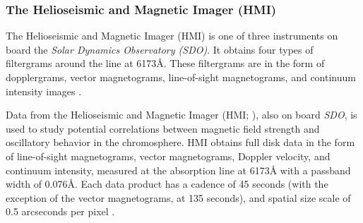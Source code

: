\subsubsection{The Helioseismic and Magnetic Imager (HMI)}

The Helioseismic and Magnetic Imager (HMI)
is one of three instruments on board
the \textit{Solar Dynamics Observatory (SDO)}. It obtains four types of
filtergrams around the  line at 6173\AA{}. These filtergrams are
in the form of dopplergrams, vector magnetograms, line-of-sight magnetograms,
and continuum intensity images \citep{hmi}.


Data from
the Helioseismic and Magnetic Imager (HMI; \cite{Scherrer2012}),
also on board \textit{SDO}, is used to study potential
correlations between magnetic field strength and oscillatory
behavior in the chromosphere.
HMI obtains full disk data in the form of
line-of-sight magnetograms, vector magnetograms,
Doppler velocity, and continuum intensity,
measured at the  absorption line at 6173\AA{}
with a passband width of 0.076\AA{}.
Each data product has a cadence of 45 seconds (with the exception
of the vector magnetograms, at 135 seconds),
and {spatial size scale} of 0.5 arcseconds per pixel
\citep{Schou2012}.
